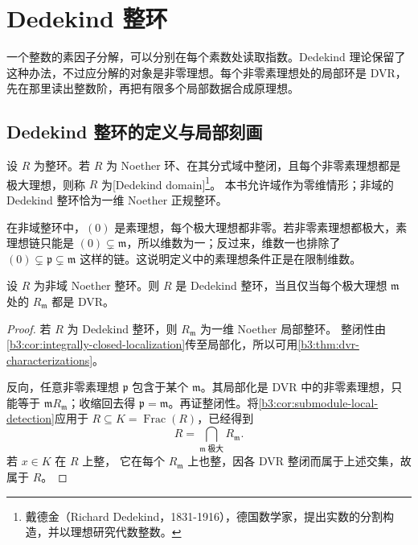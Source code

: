
\section{Dedekind 整环}
\label{b3:sec:1003}

一个整数的素因子分解，可以分别在每个素数处读取指数。Dedekind 理论保留了这种办法，不过应分解的对象是非零理想。每个非零素理想处的局部环是 DVR，先在那里读出整数阶，再把有限多个局部数据合成原理想。


\subsection{Dedekind 整环的定义与局部刻画}
\label{b3:subsec:1003:01}

\begin{definition}\label{b3:def:dedekind-domain}
	设 \(R\) 为整环。若 \(R\) 为 Noether 环、在其分式域中整闭，且每个非零素理想都是极大理想，则称 \(R\) 为[Dedekind domain]\footnote{戴德金（Richard Dedekind，1831-1916），德国数学家，提出实数的分割构造，并以理想研究代数整数。}。 本书允许域作为零维情形；非域的 Dedekind 整环恰为一维 Noether 正规整环。
\end{definition}

在非域整环中，\((0)\) 是素理想，每个极大理想都非零。若非零素理想都极大，素理想链只能是 \((0)\subsetneq\mathfrak m\)，所以维数为一；反过来，维数一也排除了 \((0)\subsetneq\mathfrak p\subsetneq\mathfrak m\) 这样的链。这说明定义中的素理想条件正是在限制维数。

\begin{theorem}\label{b3:thm:dedekind-local-characterization}
	设 \(R\) 为非域 Noether 整环。则 \(R\) 是 Dedekind 整环，当且仅当每个极大理想 \(\mathfrak m\) 处的 \(R_{\mathfrak m}\) 都是 DVR。
\end{theorem}
\begin{proof}
	若 \(R\) 为 Dedekind 整环，则 \(R_{\mathfrak m}\) 为一维 Noether 局部整环。 整闭性由\cref{b3:cor:integrally-closed-localization}传至局部化，所以可用\cref{b3:thm:dvr-characterizations}。

	反向，任意非零素理想 \(\mathfrak p\) 包含于某个 \(\mathfrak m\)。其局部化是 DVR 中的非零素理想，只能等于 \(\mathfrak mR_{\mathfrak m}\)；收缩回去得 \(\mathfrak p=\mathfrak m\)。再证整闭性。将\cref{b3:cor:submodule-local-detection}应用于 \(R\subseteq K=\operatorname{Frac}(R)\)，已经得到
	\[
		R=\bigcap_{\mathfrak m\;\text{极大}}R_{\mathfrak m}.
	\]
	若 \(x\in K\) 在 \(R\) 上整， 它在每个 \(R_{\mathfrak m}\) 上也整，因各 DVR 整闭而属于上述交集，故属于 \(R\)。
\end{proof}

